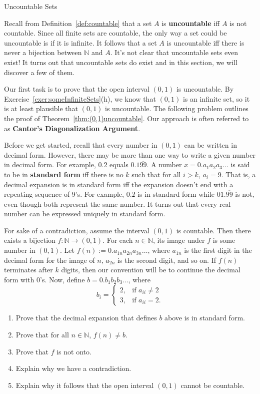 \begin{section}{Uncountable Sets}

Recall from Definition~\ref{def:countable} that a set $A$ is \textbf{uncountable} iff $A$ is not countable.  Since all finite sets are countable, the only way a set could be uncountable is if it is infinite.  It follows that a set $A$ is uncountable iff there is never a bijection between $\mathbb{N}$ and $A$.  It's not clear that uncountable sets even exist!  It turns out that uncountable sets do exist and in this section, we will discover a few of them.

Our first task is to prove that the open interval $(0,1)$ is uncountable.  By Exercise~\ref{exer:someInfiniteSets}(h), we know that $(0,1)$ is an infinite set, so it is at least plausible that $(0,1)$ is uncountable.  The following problem outlines the proof of Theorem~\ref{thm:(0,1)uncountable}.  Our approach is often referred to as \textbf{Cantor's Diagonalization Argument}.

Before we get started, recall that every number in $(0,1)$ can be written in decimal form. However, there may be more than one way to write a given number in decimal form.  For example, $0.2$ equals $0.1\overline{99}$.  A number $x=0.a_1a_2a_3\ldots$ is said to be in \textbf{standard form} iff there is no $k$ such that for all $i>k$, $a_i=9$. That is, a decimal expansion is in standard form iff the expansion doesn't end with a repeating sequence of 9's. For example, $0.2$ is in standard form while $01.\overline{99}$ is not, even though both represent the same number. It turns out that every real number can be expressed uniquely in standard form.

\begin{problem}


For sake of a contradiction, assume the interval $(0,1)$ is countable.  Then there exists a bijection $f:\mathbb{N}\to (0,1)$. For each $n\in\mathbb{N}$, its image under $f$ is some number in $(0,1)$.  Let $f(n):=0.a_{1n}a_{2n}a_{3n}\ldots$, where $a_{1n}$ is the first digit in the decimal form for the image of $n$, $a_{2n}$ is the second digit, and so on. If $f(n)$ terminates after $k$ digits, then our convention will be to continue the decimal form with 0's. Now, define $b=0.b_1b_2b_3\ldots$, where
\[
b_i=\begin{cases}
2, & \text{if }a_{ii}\neq 2\\
3, & \text{if }a_{ii}=2.
\end{cases}
\]
\begin{enumerate}[label=\textrm{(\alph*)}]
\item Prove that the decimal expansion that defines $b$ above is in standard form.
\item Prove that for all $n\in\mathbb{N}$, $f(n)\neq b$.
\item Prove that $f$ is not onto.
\item Explain why we have a contradiction.
\item Explain why it follows that the open interval $(0,1)$ cannot be countable.
\end{enumerate}
\end{problem}


\end{section}
